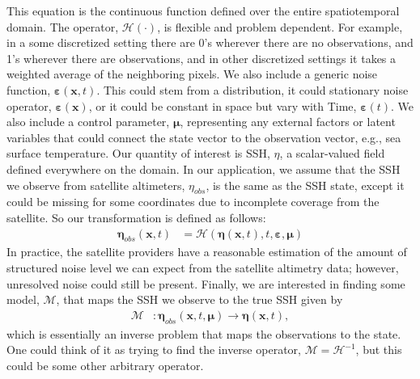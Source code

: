 %
%
This equation is the continuous function defined over the entire spatiotemporal domain.  
The operator, $\mathcal{H}(\cdot)$, is flexible and problem dependent.
For example, in a some discretized setting there are 0's wherever there are no observations, and 1's wherever there are observations, and in other discretized settings it takes a weighted average of the neighboring pixels.
We also include a generic noise function, $\boldsymbol{\varepsilon}(\mathbf{x},t)$.
This could stem from a distribution, it could stationary noise operator, $\boldsymbol{\varepsilon}(\mathbf{x})$, or it could be constant in space but vary with Time, $\boldsymbol{\varepsilon}(t)$. 
We also include a control parameter, $\boldsymbol{\mu}$, representing any external factors or latent variables that could connect the state vector to the observation vector, e.g., sea surface temperature.
%
%
%
Our quantity of interest is SSH, $\eta$, a scalar-valued field defined everywhere on the domain. In our application, we assume that the SSH we observe from satellite altimeters, $\eta_{obs}$, is the same as the SSH state, except it could be missing for some coordinates due to incomplete coverage from the satellite. So our transformation is defined as follows:
%
\begin{align} \label{eq:ssh_field_continuous}
\boldsymbol{\eta}_{obs}(\mathbf{x},t) &= \mathcal{H}\left(\boldsymbol{\eta}(\mathbf{x},t), t, \boldsymbol{\varepsilon}, \boldsymbol{\mu}\right)
\end{align}
%
In practice, the satellite providers have a reasonable estimation of the amount of structured noise level we can expect from the satellite altimetry data; however, unresolved noise could still be present. 
Finally, we are interested in finding some model, $\mathcal{M}$, that maps the SSH we observe to the true SSH given by
%
\begin{align} \label{eq:interp_problem}
    \mathcal{M} &: \boldsymbol{\eta}_{obs}(\mathbf{x}, t, \boldsymbol{\mu}) \rightarrow \boldsymbol{\eta}(\mathbf{x},t),
\end{align}
%
which is essentially an inverse problem that maps the observations to the state.
One could think of it as trying to find the inverse operator, $\mathcal{M}=\mathcal{H}^{-1}$, but this could be some other arbitrary operator.  
%
